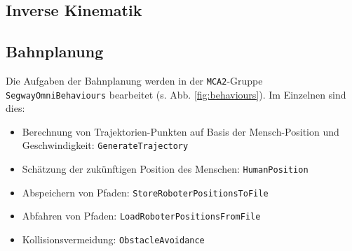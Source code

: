

\subsection{Inverse Kinematik}
\label{inverse_kinematik_subsec}
\authorsection{\editorjulian}



\subsection{Bahnplanung}
\label{bahnplanung_subsec}
\authorsection{\editortobias}



Die Aufgaben der Bahnplanung werden in der \lstinline{MCA2}-Gruppe \lstinline{SegwayOmniBehaviours} bearbeitet (s. Abb. \ref{fig:behaviours}).
Im Einzelnen sind dies:
\begin{itemize}
	\item Berechnung von Trajektorien-Punkten auf Basis der Mensch-Position und Geschwindigkeit: \lstinline{GenerateTrajectory}
	\item Schätzung der zukünftigen Position des Menschen: \lstinline{HumanPosition}
	\item Abspeichern von Pfaden: \lstinline{StoreRoboterPositionsToFile}
	\item Abfahren von Pfaden: \lstinline{LoadRoboterPositionsFromFile}
	\item Kollisionsvermeidung: \lstinline{ObstacleAvoidance}
\end{itemize}

